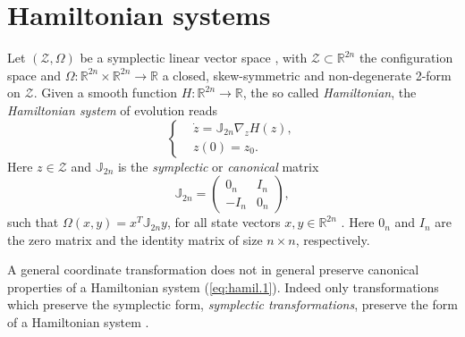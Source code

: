 \section{Hamiltonian systems}
\label{sec:hamil}

Let $(\mathcal Z, \Omega)$ be a symplectic linear vector space \cite{Marsden:2010:IMS:1965128}, with $\mathcal Z \subset \mathbb R^{2n}$ the configuration space and $\Omega:\mathbb R^{2n}\times\mathbb R^{2n} \to \mathbb R$ a closed, skew-symmetric and non-degenerate 2-form on $\mathcal Z$.  Given a smooth function $H:\mathbb R^{2n} \to \mathbb R$, the so called \emph{Hamiltonian}, the \emph{Hamiltonian system} of evolution reads
\begin{equation} \label{eq:hamil.1}
\left\{
\begin{aligned}
	& \dot z = \mathbb J_{2n} \nabla_z H(z),  \\
	&  z(0) = z_0.
\end{aligned}
\right.
\end{equation}
Here $z\in \mathcal Z$  and $\mathbb J_{2n}$ is the \emph{symplectic} or \emph{canonical} matrix
\begin{equation} \label{eq:hamil.2}
	\mathbb{J}_{2n} = 
	\begin{pmatrix}
	0_n & I_n \\
	-I_n & 0_n
	\end{pmatrix},
\end{equation}
such that $\Omega(x,y) = x^T\mathbb J_{2n}y$, for all state vectors $x,y\in \mathbb R^{2n}$ \cite{Marsden:2010:IMS:1965128}. Here $0_n$ and $I_n$ are the zero matrix and the identity matrix of size $n\times n$, respectively.

A general coordinate transformation does not in general preserve canonical properties of a Hamiltonian system (\ref{eq:hamil.1}). Indeed only transformations which preserve the symplectic form, \emph{symplectic transformations}, preserve the form of a Hamiltonian system \cite{Hairer:1250576}.


